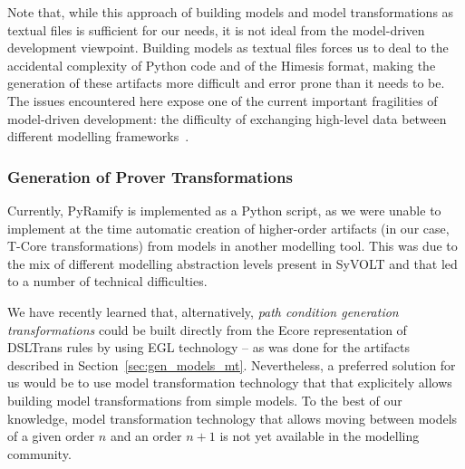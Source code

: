 Note that, while this approach of building models and model transformations as
textual files is sufficient for our needs, it is not ideal from the model-driven
development viewpoint. Building models as textual files forces us to deal to
the accidental complexity of Python code and of the Himesis format, making the
generation of these artifacts more difficult and error prone than it needs to
be. The issues encountered here expose one of the current important fragilities
of model-driven development: the difficulty of exchanging high-level data
between different modelling frameworks~.

\subsubsection{Generation of Prover Transformations}

Currently, PyRamify is implemented as a Python script, as we were unable to
implement at the time automatic creation of higher-order artifacts (in our
case, T-Core transformations) from models in another modelling tool.
This was due to the mix of different modelling abstraction levels present in
SyVOLT and that led to a number of technical difficulties.

We have recently learned that, alternatively, \emph{path condition generation
transformations} could be built directly from the Ecore representation of
DSLTrans rules by using EGL technology -- as was done for the artifacts
described in Section~\ref{sec:gen_models_mt}. Nevertheless, a preferred solution
for us would be to use model transformation technology that that explicitely
allows building model transformations from simple models. To the best of our
knowledge, model transformation technology that allows moving between models of
a given order $n$ and an order $n+1$ is not yet available in the modelling
community.
